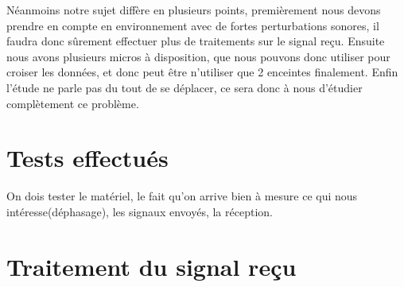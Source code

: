 \documentclass[12pt,a4paper]{report}
\begin{document}
Néanmoins notre sujet diffère en plusieurs points, premièrement nous devons prendre en compte en environnement avec de fortes perturbations sonores, il faudra donc sûrement effectuer plus de traitements sur le signal reçu. Ensuite nous avons plusieurs micros à disposition, que nous pouvons donc utiliser pour croiser les données, et donc peut être n'utiliser que 2 enceintes finalement. Enfin l'étude ne parle pas du tout de se déplacer, ce sera donc à nous d'étudier complètement ce problème.


\chapter{Tests effectués}
On dois tester le matériel, le fait qu'on arrive bien à mesure ce qui nous intéresse(déphasage), les signaux envoyés, la réception.
\chapter{Traitement du signal reçu}



\end{document}
